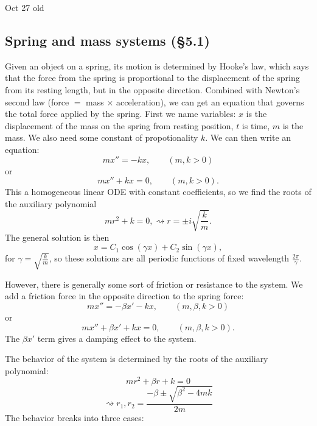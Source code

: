 \documentclass[12pt]{amsart}
\numberwithin{equation}{section}
\theoremstyle{plain} %
\newcommand{\Oct}[1]{Oct #1 old}
\newcommand{\rsa}{\rightsquigarrow}
\theoremstyle{definition}
\theoremstyle{remark}
\begin{document}
\Oct{27}

\subsection{Spring and mass systems (\S5.1)}

Given an object on a spring, its motion is determined by Hooke's law, which says that the force from the spring is proportional to the displacement of the spring from its resting length, but in the opposite direction. Combined with Newton's second law (force $=$ mass $\times$ acceleration), we can get an equation that governs the total force applied by the spring. First we name variables:
$x$ is the displacement of the mass on the spring from resting position, $t$ is time, $m$ is the mass. We also need some constant of propotionality $k$. We can then write an equation:
\[ m x'' = - k x, \qquad (m,k>0) \]
 or
\[ m x'' + k x = 0,  \qquad (m,k>0). \]
This a homogeneous linear ODE with constant coefficients, so we find the roots of the auxiliary polynomial
\[ m r^2 + k = 0, \rsa r = \pm i \sqrt{\frac{k}{m}}.\]
The general solution is then
\[ x = C_1 \cos(\gamma x) + C_2 \sin(\gamma x),\]
for $\gamma= \sqrt{ \frac{k}{m} }$, so these solutions are all periodic functions of fixed wavelength $\frac{2 \pi}{\gamma}$.

However, there is generally some sort of friction or resistance to the system. We add a friction force in the opposite direction to the spring force:
\[ m x'' = - \beta x' - k x, \qquad (m,\beta,k>0)\]
or
\[ m x'' + \beta x' + k x = 0, \qquad (m,\beta,k>0).\]
The $\beta x'$ term gives a damping effect to the system.

The behavior of the system is determined by the roots of the auxiliary polynomial:
\[ m r^2 + \beta r + k  = 0\]
\[\rsa r_1,r_2= \frac{ - \beta \pm \sqrt{\beta^2- 4 m k }}{2 m}\]
The behavior breaks into three cases:
\end{document}
